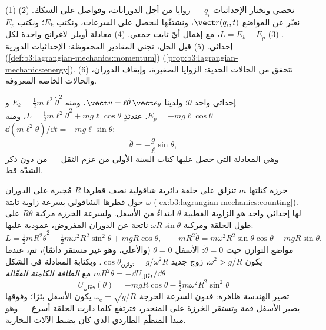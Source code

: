 \begin{method}\label{met:b3:lagrangian-mechanics:recipe}
(1) نحصي  ونختار الإحداثيات $q_i$ --- زوايا من أجل
الدورانات، وفواصل على السكك. (2) نعبّر عن المواضع
$\vect r(q_i, t)$، ونشتقّها لنحصل على السرعات، ونكتب $E_k$؛ ونكتب
$E_p$. (3) $L = E_k - E_p$، مع إهمال أيّ ثابت جمعي. (4) معادلة
أويلر--لاغرانج واحدة لكل إحداثي. (5) قبل الحل، نجني المقادير
المحفوظة: الإحداثيات الدورية
(\cref{def:b3:lagrangian-mechanics:momentum}) 
(\cref{prop:b3:lagrangian-mechanics:energy}). (6) نتحقق من الحالات
الحدية: الزوايا الصغيرة، وإيقاف الدوران، والحالات الخاصة المعروفة.
\end{method}

\begin{example}\label{ex:b3:lagrangian-mechanics:pendulum}
إحداثي واحد $\theta$؛ ولدينا $\vect v = \ell\dot\theta\,\vect e_\theta$،
ومنه $E_k = \tfrac12 m\ell^2\dot\theta^2$ و $E_p = -mg\ell\cos\theta$.
عندئذٍ $L = \tfrac12 m\ell^2\dot\theta^2 + mg\ell\cos\theta$، ومنه
$\dd(m\ell^2\dot\theta)/\dd t = -mg\ell\sin\theta$:
\[
\ddot\theta = -\frac{g}{\ell}\sin\theta ,
\]
وهي المعادلة التي حصل عليها كتاب السنة الأولى من عزم الثقل ---
من دون ذكر الشدّة قط.
\end{example}

\begin{example}\label{ex:b3:lagrangian-mechanics:hoop}
خرزة كتلتها $m$ تنزلق على حلقة دائرية شاقولية نصف قطرها $R$
مُجبرة على الدوران حول قطرها الشاقولي بسرعة زاوية ثابتة $\omega$
(\cref{ex:b3:lagrangian-mechanics:counting}). لها إحداثي واحد هو
الزاوية القطبية $\theta$ ابتداءً من الأسفل. ولسرعة الخرزة مركبة
$R\dot\theta$ على طول الحلقة ومركبة $\omega R\sin\theta$ ناتجة عن
الدوران المفروض، عمودية عليها:
\[
L = \tfrac12 mR^2\dot\theta^2 + \tfrac12 m\omega^2R^2\sin^2\theta
 + mgR\cos\theta ,
\qquad
mR^2\ddot\theta = m\omega^2R^2\sin\theta\cos\theta - mgR\sin\theta .
\]
مواضع التوازن حيث $\ddot\theta = 0$: الأسفل $\theta = 0$ (والأعلى،
وهو غير مستقر دائمًا)، ثم، عندما يكون $\omega^2 > g/R$، زوج جديد
$\cos\theta_{\text{توازن}} = g/\omega^2R$. وبكتابة المعادلة في الشكل
$mR^2\ddot\theta = -\dd U_{\text{فعّال}}/\dd\theta$ مع
\emph{الطاقة الكامنة الفعّالة}
\[
U_{\text{فعّال}}(\theta) = -mgR\cos\theta
 - \tfrac12 m\omega^2R^2\sin^2\theta
\]
تصير الهندسة ظاهرة: فدون السرعة الحرجة
$\omega_{\text{c}} = \sqrt{g/R}$ يكون الأسفل بئرًا؛ وفوقها يصير
الأسفل قمة وتستقر الخرزة على المنحدر، فترتفع كلما دارت الحلقة
أسرع --- وهو مبدأ المنظّم الطاردي الذي كان يضبط الآلات البخارية.
\end{example}

